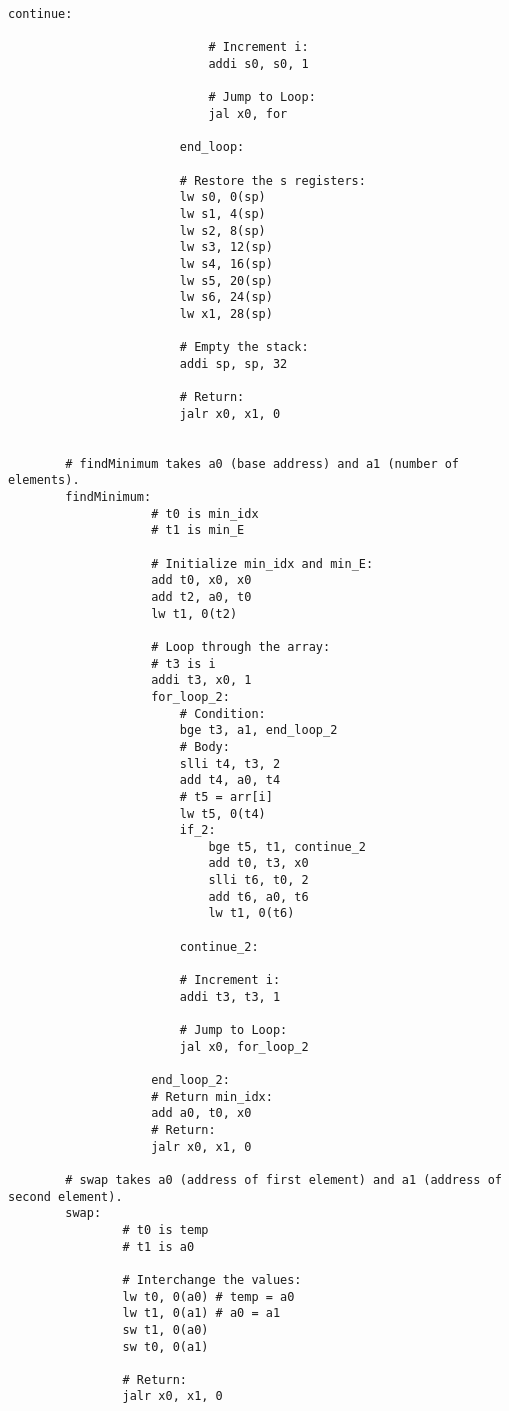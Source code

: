 \documentclass[12pt]{article}
\begin{document}
\begin{lstlisting}[language=RISCV]
                            continue:

                            # Increment i:
                            addi s0, s0, 1

                            # Jump to Loop:
                            jal x0, for 

                        end_loop:

                        # Restore the s registers:
                        lw s0, 0(sp)
                        lw s1, 4(sp)
                        lw s2, 8(sp)
                        lw s3, 12(sp)
                        lw s4, 16(sp)
                        lw s5, 20(sp)
                        lw s6, 24(sp)
                        lw x1, 28(sp)

                        # Empty the stack:
                        addi sp, sp, 32

                        # Return:
                        jalr x0, x1, 0


        # findMinimum takes a0 (base address) and a1 (number of elements).
        findMinimum:
                    # t0 is min_idx
                    # t1 is min_E

                    # Initialize min_idx and min_E:
                    add t0, x0, x0
                    add t2, a0, t0
                    lw t1, 0(t2)

                    # Loop through the array:
                    # t3 is i
                    addi t3, x0, 1
                    for_loop_2:
                        # Condition:
                        bge t3, a1, end_loop_2
                        # Body:
                        slli t4, t3, 2
                        add t4, a0, t4
                        # t5 = arr[i]
                        lw t5, 0(t4)
                        if_2:
                            bge t5, t1, continue_2
                            add t0, t3, x0
                            slli t6, t0, 2
                            add t6, a0, t6
                            lw t1, 0(t6)

                        continue_2:
                        
                        # Increment i:
                        addi t3, t3, 1

                        # Jump to Loop:
                        jal x0, for_loop_2
                    
                    end_loop_2:
                    # Return min_idx:
                    add a0, t0, x0
                    # Return:
                    jalr x0, x1, 0

        # swap takes a0 (address of first element) and a1 (address of second element).
        swap:
                # t0 is temp
                # t1 is a0
		
                # Interchange the values:
                lw t0, 0(a0) # temp = a0
                lw t1, 0(a1) # a0 = a1 
                sw t1, 0(a0)
                sw t0, 0(a1)
	
                # Return:
                jalr x0, x1, 0
    \end{lstlisting}
\end{document}
